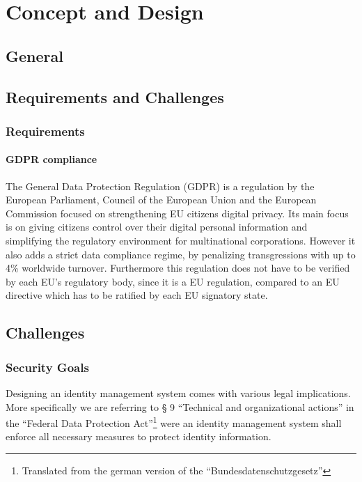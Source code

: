 
\chapter{Concept and Design}
\label{cha:conceptanddesign}

\section{General}

\section{Requirements and Challenges}

\subsection{Requirements}

\subsubsection{GDPR compliance}
\label{subsubsec:GDPR_compliance}
The General Data Protection Regulation (GDPR) is a regulation by the European Parliament, Council of the European Union and the European Commission focused on strengthening EU citizens digital privacy.  Its main focus is on giving citizens control over their digital personal information and simplifying the regulatory environment for multinational corporations. However it also adds a strict data compliance regime, by penalizing transgressions with up to 4\% worldwide turnover\cite{gdpr}. Furthermore this regulation does not have to be verified by each EU's regulatory body, since it is a EU regulation, compared to an EU directive which has to be ratified by each EU signatory state.

\section{Challenges}
\label{sec:challenges}

\subsection{Security Goals}
\label{sec:securityGoals}

Designing an identity management system comes with various legal implications. More specifically we are referring to § 9 “Technical and organizational actions” in the “Federal Data Protection Act”\footnote{Translated from the german version of the  “Bundesdatenschutzgesetz”} were an identity management system shall enforce all necessary measures to protect identity information.\cite{bdsg}

